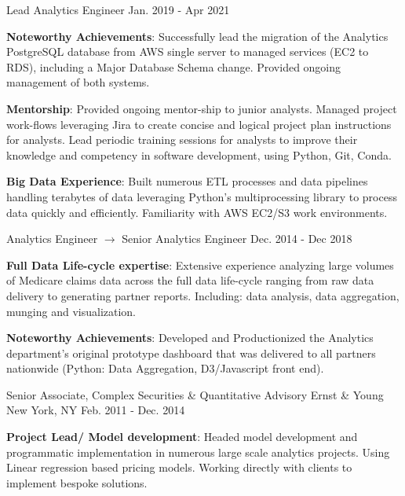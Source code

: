\begin{cventries}
{\begin{cvitems}
      \end{cvitems}
    }
  \cventry
    {Lead Analytics Engineer}
    {}
    {}
    {Jan. 2019 - Apr 2021}
    {
      \begin{cvitems}
          \item {\textbf{Noteworthy Achievements}: Successfully lead the migration of the Analytics PostgreSQL database from AWS single server to managed services (EC2 to RDS), including a Major Database Schema change. Provided ongoing management of both systems.}
          \item {\textbf{Mentorship}: Provided ongoing mentor-ship to junior analysts. Managed project work-flows leveraging Jira to create concise and logical project plan instructions for analysts. Lead periodic training sessions for analysts to improve their knowledge and competency in software development, using Python, Git, Conda.}
          \item {\textbf{Big Data Experience}: Built numerous ETL processes and data pipelines handling terabytes of data leveraging Python's multiprocessing library to process data quickly and efficiently. Familiarity with AWS EC2/S3 work environments.}          
      \end{cvitems}
    }
  \cventry
    {Analytics Engineer $\rightarrow$ Senior Analytics Engineer}
    {}
    {}
    {Dec. 2014 - Dec 2018}
    {
      \begin{cvitems}
          \item {\textbf{Full Data Life-cycle expertise}: Extensive experience analyzing large volumes of Medicare claims data across the full data life-cycle ranging from raw data delivery to generating partner reports. Including: data analysis, data aggregation, munging and visualization.
          }
          \item {\textbf{Noteworthy Achievements}: Developed and Productionized the Analytics department's original prototype dashboard that was delivered to all partners nationwide (Python: Data Aggregation, D3/Javascript front end).
          }
      \end{cvitems}
    }
  \cventry
    {Senior Associate, Complex Securities \& Quantitative Advisory}
    {Ernst \& Young}
    {New York, NY}
    {Feb. 2011 - Dec. 2014}
    {
      \begin{cvitems}
        \item {\textbf{Project Lead/ Model development}: Headed model development and programmatic implementation in numerous large scale analytics projects. Using Linear regression based pricing models. Working directly with clients to implement bespoke solutions.}

\end{cvitems}}
\end{cventries}
